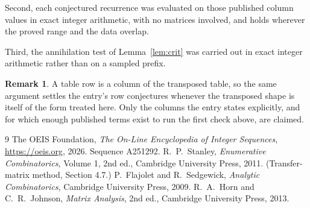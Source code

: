 \documentclass[11pt,a4paper]{article}
\theoremstyle{plain}
\theoremstyle{definition}
\newtheorem{remark}[theorem]{Remark}
\begin{document}
Second, each conjectured recurrence was evaluated on those published column values in exact
integer arithmetic, with no matrices involved, and holds wherever the proved range and the
data overlap.

Third, the annihilation test of Lemma~\ref{lem:crit} was carried out in exact integer
arithmetic rather than on a sampled prefix.

\begin{remark}
A table row is a column of the transposed table, so the same argument settles the entry's row
conjectures whenever the transposed shape is itself of the form treated here. Only the columns
the entry states explicitly, and for which enough published terms exist to run the first check
above, are claimed.
\end{remark}

\begin{thebibliography}{9}
 The OEIS Foundation, \emph{The On-Line Encyclopedia of Integer
Sequences}, \url{https://oeis.org}, 2026. Sequence A251292.
 R.~P.~Stanley, \emph{Enumerative Combinatorics}, Volume 1, 2nd ed.,
Cambridge University Press, 2011. (Transfer-matrix method, Section 4.7.)
 P.~Flajolet and R.~Sedgewick, \emph{Analytic Combinatorics}, Cambridge
University Press, 2009.
 R.~A.~Horn and C.~R.~Johnson, \emph{Matrix Analysis}, 2nd ed., Cambridge
University Press, 2013.
\end{thebibliography}
\end{document}
